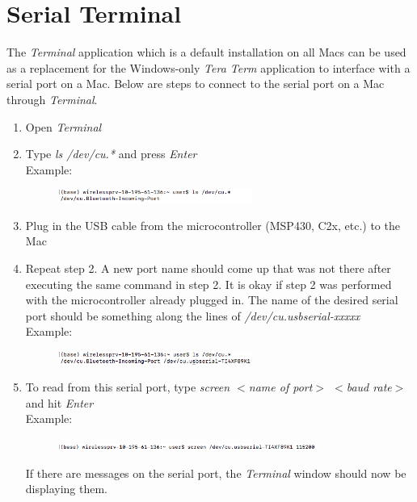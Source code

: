 \documentclass{article}
\begin{document}
\pagebreak

\section{Serial Terminal}

The \textit{Terminal} application which is a default installation on all Macs can be used as a replacement for the Windows-only \textit{Tera Term} application to interface with a serial port on a Mac. Below are steps to connect to the serial port on a Mac through \textit{Terminal}.

\begin{enumerate}
  \item Open \textit{Terminal}
  \item Type \textit{ls /dev/cu.*} and press \textit{Enter} \\ Example: 
  \begin{figure}[H]
    \centering
    \includegraphics[width = 0.6\textwidth]{step2.png} 
  \end{figure}
  \item Plug in the USB cable from the microcontroller (MSP430, C2x, etc.) to the Mac
  \item Repeat step 2. A new port name should come up that was not there after executing the same command in step 2. It is okay if step 2 was performed with the microcontroller already plugged in. The name of the desired serial port should be something along the lines of \textit{/dev/cu.usbserial-xxxxx} \\ Example:
  \begin{figure}[H]
    \centering
    \includegraphics[width = 0.6\textwidth]{step4.png} 
  \end{figure}
  \item To read from this serial port, type \textit{screen $<$name of port$>$ $<$baud rate$>$} and hit \textit{Enter} \\ Example:
  \begin{figure}[H]
    \centering
    \includegraphics[width = 0.8\textwidth]{step5.png} 
  \end{figure}
  If there are messages on the serial port, the \textit{Terminal} window should now be displaying them. \\

\end{enumerate}
\end{document}
